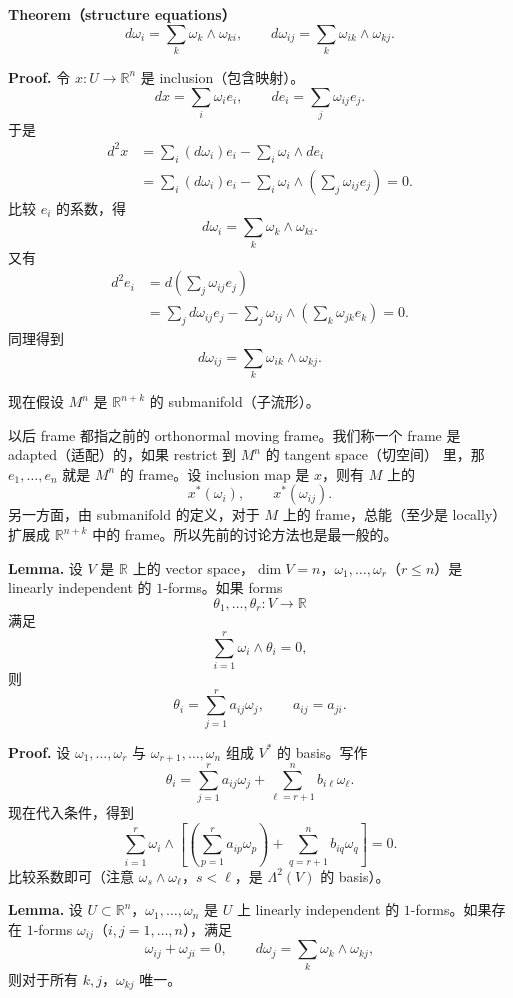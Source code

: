 \documentclass[UTF8,11pt,a4paper]{ctexart}
\begin{document}
\textbf{Theorem（structure equations）}
\[
d\omega_i=\sum_k\omega_k\wedge\omega_{ki},
\qquad
d\omega_{ij}=\sum_k\omega_{ik}\wedge\omega_{kj}.
\]

\textbf{Proof.} 令 $x\colon U\longrightarrow\mathbb{R}^n$ 是 inclusion（包含映射）。
\[
dx=\sum_i\omega_i e_i,
\qquad
de_i=\sum_j\omega_{ij}e_j.
\]
于是
\begin{align*}
d^2x
&=\sum_i(d\omega_i)e_i-\sum_i\omega_i\wedge de_i\\
&=\sum_i(d\omega_i)e_i
  -\sum_i\omega_i\wedge\left(\sum_j\omega_{ij}e_j\right)=0.
\end{align*}
比较 $e_i$ 的系数，得
\[
d\omega_i=\sum_k\omega_k\wedge\omega_{ki}.
\]
又有
\begin{align*}
d^2e_i
&=d\left(\sum_j\omega_{ij}e_j\right)\\
&=\sum_j d\omega_{ij}e_j
  -\sum_j\omega_{ij}\wedge\left(\sum_k\omega_{jk}e_k\right)=0.
\end{align*}
同理得到
\[
d\omega_{ij}=\sum_k\omega_{ik}\wedge\omega_{kj}.
\]

\medskip
现在假设 $M^n$ 是 $\mathbb{R}^{n+k}$ 的 submanifold（子流形）。

以后 frame 都指之前的 orthonormal moving frame。我们称一个 frame 是 adapted（适配）的，如果 restrict 到 $M^n$ 的 tangent space（切空间） 里，那 $e_1,\ldots,e_n$ 就是 $M^n$ 的 frame。设 inclusion map 是 $x$，则有 $M$ 上的
\[
x^*(\omega_i),\qquad x^*(\omega_{ij}).
\]
另一方面，由 submanifold 的定义，对于 $M$ 上的 frame，总能（至少是 locally）扩展成 $\mathbb{R}^{n+k}$ 中的 frame。所以先前的讨论方法也是最一般的。

\medskip
\textbf{Lemma.} 设 $V$ 是 $\mathbb{R}$ 上的 vector space，$\dim V=n$，$\omega_1,\ldots,\omega_r$（$r\leq n$）是 linearly independent 的 $1$-forms。如果 forms
\[
\theta_1,\ldots,\theta_r\colon V\longrightarrow\mathbb{R}
\]
满足
\[
\sum_{i=1}^r\omega_i\wedge\theta_i=0,
\]
则
\[
\theta_i=\sum_{j=1}^r a_{ij}\omega_j,
\qquad a_{ij}=a_{ji}.
\]

\textbf{Proof.} 设 $\omega_1,\ldots,\omega_r$ 与 $\omega_{r+1},\ldots,\omega_n$ 组成 $V^*$ 的 basis。写作
\[
\theta_i=\sum_{j=1}^r a_{ij}\omega_j
+\sum_{\ell=r+1}^n b_{i\ell}\omega_\ell.
\]
现在代入条件，得到
\[
\sum_{i=1}^r\omega_i\wedge
\left[
\left(\sum_{p=1}^r a_{ip}\omega_p\right)
+\sum_{q=r+1}^n b_{iq}\omega_q
\right]=0.
\]
比较系数即可（注意 $\omega_s\wedge\omega_\ell$，$s<\ell$，是 $\Lambda^2(V)$ 的 basis）。

\medskip
\textbf{Lemma.} 设 $U\subset\mathbb{R}^n$，$\omega_1,\ldots,\omega_n$ 是 $U$ 上 linearly independent 的 $1$-forms。如果存在 $1$-forms $\omega_{ij}$（$i,j=1,\ldots,n$），满足
\[
\omega_{ij}+\omega_{ji}=0,
\qquad d\omega_j=\sum_k\omega_k\wedge\omega_{kj},
\]
则对于所有 $k,j$，$\omega_{kj}$ 唯一。
\end{document}
